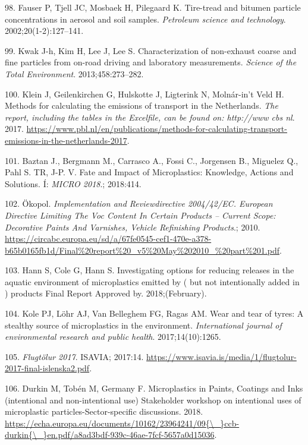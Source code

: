 \documentclass[icelandic,]{book}
\begin{document}
\leavevmode\hypertarget{ref-fauser2002tire}{}%
98. Fauser P, Tjell JC, Mosbaek H, Pilegaard K. Tire-tread and bitumen particle concentrations in aerosol and soil samples. \emph{Petroleum science and technology}. 2002;20(1-2):127--141.

\leavevmode\hypertarget{ref-kwak2013characterization}{}%
99. Kwak J-h, Kim H, Lee J, Lee S. Characterization of non-exhaust coarse and fine particles from on-road driving and laboratory measurements. \emph{Science of the Total Environment}. 2013;458:273--282.

\leavevmode\hypertarget{ref-klein2017methods}{}%
100. Klein J, Geilenkirchen G, Hulskotte J, Ligterink N, Molnár-in't Veld H. Methods for calculating the emissions of transport in the Netherlands. \emph{The report, including the tables in the Excelfile, can be found on: http://www cbs nl}. 2017. \url{https://www.pbl.nl/en/publications/methods-for-calculating-transport-emissions-in-the-netherlands-2017}.

\leavevmode\hypertarget{ref-BaztanJ2018}{}%
101. Baztan J., Bergmann M., Carrasco A., Fossi C., Jorgensen B., Miguelez Q., Pahl S. TR, J-P. V. Fate and Impact of Microplastics: Knowledge, Actions and Solutions. Í: \emph{MICRO 2018}.; 2018:414.

\leavevmode\hypertarget{ref-Commission2009}{}%
102. Ökopol. \emph{Implementation and Reviewdirective 2004/42/EC. European Directive Limiting The Voc Content In Certain Products -- Current Scope: Decorative Paints And Varnishes, Vehicle Refinishing Products}.; 2010. \url{https://circabc.europa.eu/sd/a/67fe0545-cef1-470e-a378-b65b0165fb1d/Final\%20report\%20_v5\%20May\%202010_\%20part\%201.pdf}.

\leavevmode\hypertarget{ref-Hann2018}{}%
103. Hann S, Cole G, Hann S. Investigating options for reducing releases in the aquatic environment of microplastics emitted by ( but not intentionally added in ) products Final Report Approved by. 2018;(February).

\leavevmode\hypertarget{ref-kole2017wear}{}%
104. Kole PJ, Löhr AJ, Van Belleghem FG, Ragas AM. Wear and tear of tyres: A stealthy source of microplastics in the environment. \emph{International journal of environmental research and public health}. 2017;14(10):1265.

\leavevmode\hypertarget{ref-isavia2017}{}%
105. \emph{Flugtölur 2017}. ISAVIA; 2017:14. \url{https://www.isavia.is/media/1/flugtolur-2017-final-islenska2.pdf}.

\leavevmode\hypertarget{ref-Durkin2018}{}%
106. Durkin M, Tobén M, Germany F. Microplastics in Paints, Coatings and Inks (intentional and non-intentional use) Stakeholder workshop on intentional uses of microplastic particles-Sector-specific discussions. 2018. \href{https://echa.europa.eu/documents/10162/23964241/09\%7B/_\%7Dccb-durkin\%7B/_\%7Den.pdf/a8ad3bdf-939c-46ae-7fcf-5657a0d15036}{https://echa.europa.eu/documents/10162/23964241/09\{\textbackslash{}\_\}ccb-durkin\{\textbackslash{}\_\}en.pdf/a8ad3bdf-939c-46ae-7fcf-5657a0d15036}.
\end{document}
